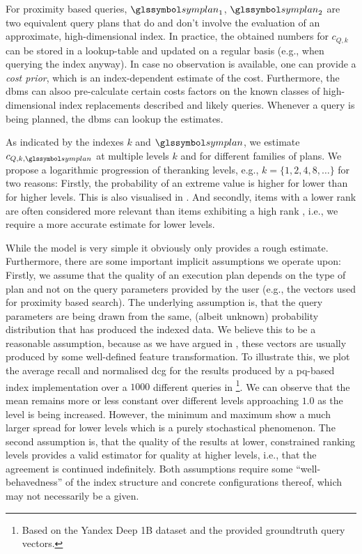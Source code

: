 For proximity based queries, $\symplan_1$, $\symplan_2$ are two equivalent query plans that do and don't involve the evaluation of an approximate, high-dimensional index. In practice, the obtained numbers for $c_{Q,k}$ can be stored in a lookup-table and updated on a regular basis (e.g., when querying the index anyway). In case no observation is available, one can provide a \emph{cost prior}, which is an index-dependent estimate of the cost. Furthermore, the \acrshort{dbms} can alsoo pre-calculate certain costs factors on the known classes of high-dimensional index replacements described  and likely queries. Whenever a query is being planned, the \acrshort{dbms} can lookup the estimates.

As indicated by the indexes $k$ and $\symplan$, we estimate $c_{Q,k,\symplan}$ at multiple levels $k$ and for different families of plans. We propose a logarithmic progression of theranking levels, e.g., $k= \{ 1, 2, 4, 8, \ldots \}$ for two reasons: Firstly, the probability of an extreme value is higher for lower than for higher levels. This is also visualised in . And secondly, items with a lower rank are often considered more relevant than items exhibiting a high rank \cite{Jarvelin:2002Cumulated}, i.e., we require a more accurate estimate for lower levels.

While the model is very simple it obviously only provides a rough estimate. Furthermore, there are some important implicit assumptions we operate upon: Firstly, we assume that the quality of an execution plan depends on the type of plan and not on the query parameters provided by the user (e.g., the vectors used for proximity based search). The underlying assumption is, that the query parameters are being drawn from the same, (albeit unknown) probability distribution that has produced the indexed data. We believe this to be a reasonable assumption, because as we have argued in , these vectors are usually produced by some well-defined feature transformation. To illustrate this, we plot the average recall and normalised \acrshort{dcg} for the results produced by a \acrshort{pq}-based index implementation over a $1000$ different queries in  \footnote{Based on the Yandex Deep 1B dataset \cite{Babenko:2016Efficient} and the provided groundtruth query vectors.}. We can observe that the mean remains more or less constant over different levels approaching $1.0$ as the level is being increased. However, the minimum and maximum show a much larger spread for lower levels which is a purely stochastical phenomenon. The second assumption is, that the quality of the results at lower, constrained ranking levels provides a valid estimator for quality at higher levels, i.e., that the agreement is continued indefinitely. Both assumptions require some ``well-behavedness'' of the index structure and concrete configurations thereof, which may not necessarily be a given.

